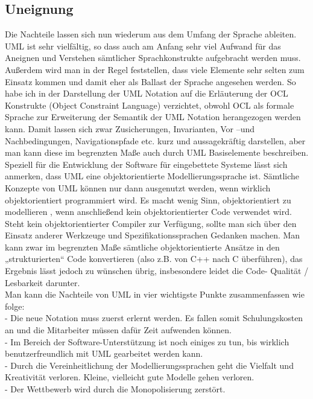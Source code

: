 \subsection{Uneignung}
Die Nachteile lassen sich nun wiederum aus dem Umfang der Sprache ableiten. UML ist sehr vielfältig, so dass auch am Anfang  sehr viel Aufwand für das Aneignen und Verstehen sämtlicher Sprachkonstrukte aufgebracht werden muss.\\ Außerdem wird man in der  Regel feststellen, dass viele Elemente sehr selten zum Einsatz kommen und damit eher als Ballast der Sprache angesehen werden. So habe ich in der Darstellung der UML Notation auf die Erläuterung der OCL Konstrukte (Object Constraint Language) verzichtet, obwohl OCL als formale Sprache zur Erweiterung der Semantik der UML Notation herangezogen werden kann. Damit lassen sich zwar Zusicherungen, Invarianten, Vor –und Nachbedingungen, Navigationspfade etc. kurz und aussagekräftig darstellen, aber man kann diese im begrenzten Maße auch durch UML Basiselemente beschreiben.\\
Speziell für die Entwicklung der Software für eingebettete Systeme lässt sich anmerken, dass UML eine objektorientierte Modellierungssprache ist. Sämtliche Konzepte von UML können nur dann ausgenutzt werden, wenn wirklich objektorientiert programmiert wird. Es macht wenig Sinn, objektorientiert zu modellieren , wenn  anschließend kein objektorientierter Code verwendet wird. Steht kein objektorientierter Compiler zur Verfügung, sollte man sich über den Einsatz anderer Werkzeuge und Spezifikationssprachen Gedanken machen. Man kann zwar im begrenzten Maße sämtliche objektorientierte Ansätze in den „strukturierten“ Code konvertieren (also z.B. von C++ nach C überführen), das Ergebnis lässt jedoch zu wünschen übrig, insbesondere leidet die Code- Qualität / Lesbarkeit darunter.\\

Man kann die Nachteile von UML in vier wichtigste Punkte zusammenfassen wie folge:\\
- Die neue Notation muss zuerst erlernt werden. Es fallen somit Schulungskosten an
und die Mitarbeiter müssen dafür Zeit aufwenden können.\\
- Im Bereich der Software-Unterstützung ist noch einiges zu tun, bis wirklich
benutzerfreundlich mit UML gearbeitet werden kann.\\
- Durch die Vereinheitlichung der Modellierungssprachen geht die Vielfalt und
Kreativität verloren. Kleine, vielleicht gute Modelle gehen verloren.\\
- Der Wettbewerb wird durch die Monopolisierung zerstört.
